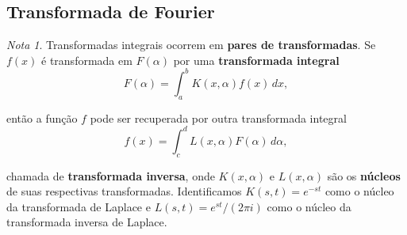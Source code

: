 \documentclass{article}
\theoremstyle{plain}
\theoremstyle{definition}
\theoremstyle{remark}
\newtheorem*{rem}{Nota}
\begin{document}
\subsection{Transformada de Fourier}

\begin{rem}
    Transformadas integrais ocorrem em \textbf{pares de transformadas}. Se \(f(x)\) é transformada em \(F(\alpha)\) por uma \textbf{transformada integral}
    \begin{equation}
        F(\alpha) = \int_{a}^{b} K(x,\alpha) f(x) \, dx,
    \end{equation}
\end{rem}

\noindent então a função \(f\) pode ser recuperada por outra transformada integral 
\begin{equation}
    f(x) = \int_{c}^{d} L(x,\alpha) F(\alpha) \, d\alpha,
\end{equation}

\noindent chamada de \textbf{transformada inversa}, onde \(K(x,\alpha)\) e \(L(x,\alpha)\) são os \textbf{núcleos} de suas respectivas transformadas. Identificamos \(K(s,t)=e^{-st}\) como o núcleo da transformada de Laplace e \(L(s,t) = e^{st}/(2\pi i)\) como o núcleo da transformada inversa de Laplace.
\end{document}
